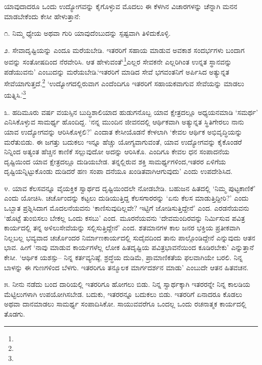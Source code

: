 ಯಾವುದಾದರೂ ಒಂದು ಉದ್ಯೋಗವನ್ನು ಕೈಗೊಳ್ಳುವ ಮೊದಲು ಈ ಕೆಳಗಿನ ವಿಚಾರಗಳನ್ನು ಚೆನ್ನಾಗಿ ಮನನ ಮಾಡಬೇಕೆಂದು ಕೇಸೀ ಹೇಳುತ್ತಾನೆ:

೧. ನಿಮ್ಮ ಧ್ಯೇಯ ಅಥವಾ ಗುರಿ ಯಾವುದೆಂಬುದನ್ನು ಸ್ಪಷ್ಟವಾಗಿ ತಿಳಿದುಕೊಳ್ಳಿ.

೨. ಸೇವಾದೃಷ್ಟಿಯನ್ನು ಎಂದೂ ಮರೆಯಬೇಡಿ. ಇತರರಿಗೆ ಸಹಾಯ ಮಾಡುವ ಅವಕಾಶ ಸಂದರ್ಭಗಳು ಬಂದಾಗ ಅವನ್ನು ಸಂತೋಷದಿಂದ ನೆರವೇರಿಸಿ. ಆತ ಹೇಳುವಂತೆ‘\footnote{}ಎಲ್ಲರ ಸೇವಕನೇ ಎಲ್ಲರಿಗಿಂತ ಉನ್ನತ ಸ್ಥಾನವನ್ನು ಪಡೆಯುವನು’ ಎಂಬುದನ್ನು ಮರೆಯಬೇಡಿ.\break ‘ಇತರರಿಗೆ ಮಾಡಿದ ಸೇವೆ ಭಗವಂತನಿಗೆ ಅರ್ಪಿಸಿದ ಅತ್ಯುನ್ನತ ಸೇವೆಯಾಗುತ್ತದೆ.\footnote{} ‘ಉದ್ಯೋಗ\-ದಲ್ಲಿರುವಾಗ ಎಂದೆಂದಿಗೂ ಇತರರಿಗೆ ಸಹಾಯಕವಾಗುವ ಸೇವೆಯನ್ನು ಮಾಡಲು ಯತ್ನಿಸಿ.'\footnote{}

೩. ಹದಿಮೂರು ವರ್ಷ ವಯಸ್ಸಿನ ಬುದ್ಧಿಶಾಲಿಯಾದ ಹುಡುಗನೊಬ್ಬ ಯಾವ ಕ್ಷೇತ್ರದಲ್ಲೂ ಅಧ್ಯಯನಮಾಡಿ ‘ಸಮರ್ಥ’ ಎನಿಸಿಕೊಳ್ಳುವ ಸಾಮರ್ಥ್ಯ ಹೊಂದಿದ್ದ. ‘ನನ್ನ ಮುಂದಿನ ಜೀವನದಲ್ಲಿ ಆರ್ಥಿಕವಾಗಿ ಅತ್ಯುನ್ನತ ಸ್ಥಿತಿಗೇರಲು ನಾನು ಯಾವ ಉದ್ಯೋಗವನ್ನು ಆರಿಸಿಕೊಳ್ಳಲಿ?’ ಎಂದಾತ ಕೇಸೀಯೊಡನೆ ಕೇಳಲಾಗಿ ‘ಕೇವಲ ಆರ್ಥಿಕ ಅಭಿವೃದ್ಧಿಯನ್ನು ಮರೆತುಬಿಡು. ಈ ಜಗತ್ತು ಬದುಕಲು ಇನ್ನೂ ಹೆಚ್ಚು ಯೋಗ್ಯವಾಗುವಂತೆ, ಯಾವ ಉದ್ಯೋಗವನ್ನು ಕೈಕೊಂಡರೆ ನಿನ್ನಿಂದ ಅತ್ಯಂತ ಹೆಚ್ಚಿನ ಕಾಣಿಕೆ ಸಲ್ಲುವುದೋ ಅದನ್ನು ಆರಿಸಿಕೊ. ಎಂದಿಗೂ ಕೇವಲ ಧನ ಸಂಪಾದನೆಯ ದೃಷ್ಟಿಯಿಂದ ಯಾವ ಕ್ಷೇತ್ರದಲ್ಲೂ ದುಡಿಯಬೇಡ. ತನ್ನಲ್ಲಿರುವ ಶಕ್ತಿ ಸಾಮರ್ಥ್ಯಗಳಿಂದ,\break ಇತರರ ಏಳಿಗೆಯ ದೃಷ್ಟಿಯನ್ನಿಟ್ಟುಕೊಂಡು ದುಡಿದರೆ ಹಣ ಸಂಪಾ ದನೆಯೂ ಖಂಡಿತವಾಗಿ\break ಆಗುವುದು’ ಎಂದು ಉಪದೇಶಿಸಿದ.

೪. ಯಾವ ಕೆಲಸವನ್ನೂ ವೈಯಕ್ತಿಕ ಸ್ವಾರ್ಥದ ದೃಷ್ಟಿಯಿಂದಲೇ ನೋಡಬೇಡಿ. ಬಹುಜನ ಹಿತದಲ್ಲಿ ‘ನಿಮ್ಮ ಪುಟ್ಟಕಾಣಿಕೆ’ ಎಂದು ಯೋಚಿಸಿ. ಚರ್ಚೊಂದನ್ನು ಕಟ್ಟಲು ದುಡಿಯುತ್ತಿದ್ದ ಕೆಲಸಗಾರರನ್ನು ‘ಏನು ಕೆಲಸ ಮಾಡುತ್ತಿದ್ದೀರಿ?’ ಎಂದು ಒಬ್ಬಾತ ಪ್ರಶ್ನಿಸಿದಾಗ ಮೊದಲನೆಯವನು ‘ಕಾಣಿಸುವುದಿಲ್ಲವೇ? ಇಟ್ಟಿಗೆ ಜೋಡಿಸುತ್ತಿದ್ದೇನೆ’ ಎಂದ. ಎರಡನೆಯವನು ‘ಹೊಟ್ಟೆ ತುಂಬಿಸಲು ಬೇಕಲ್ಲ ಒಂದು ಕಸಬು’ ಎಂದ. ಮೂರನೆಯವನು ‘ದೇವಮಂದಿರವನ್ನು ನಿರ್ಮಿಸುವ ಪವಿತ್ರ ಕಾರ್ಯದಲ್ಲಿ ತನ್ನ ಅಳಿಲುಸೇವೆಯನ್ನು ಸಲ್ಲಿಸುತ್ತಿದ್ದೇನೆ’ ಎಂದ. ಶತಮಾನಗಳ ಕಾಲ ಜನರ ಭಕ್ತಿಯ ಪ್ರತೀಕವಾಗಿ ನಿಲ್ಲಬಲ್ಲ ಭವ್ಯವಾದ ಚರ್ಚೊಂದರ ನಿರ್ಮಾಣಕಾರ್ಯದಲ್ಲಿ ಸುದೈವದಿಂದ ತಾನು ಪಾಲ್ಗೊಂಡಿದ್ದೇನೆ ಎನ್ನುವುದು ಆತನ ಭಾವ. ಹೀಗೆ ‘ನಾವು ಮಾಡುವ ಕಾರ್ಯಗಳೆಲ್ಲ ಲೋಕ ಹಿತದೃಷ್ಟಿಯ ಪವಿತ್ರಭಾವನೆಯಿಂದ ಕೂಡಿರಬೇಕು’ ಎನ್ನುತ್ತಾನೆ ಕೇಸೀ. ‘ಆರ್ಥಿಕ ಯಶಸ್ಸು– ನಿನ್ನ ಕರ್ತವ್ಯನಿಷ್ಠೆ, ಶ್ರದ್ಧೆಯ ದುಡಿಮೆ, ಪ್ರಾಮಾಣಿಕತೆಯ ಫಲವಾಗಿಯೇ ಬರಲಿ. ನಿನ್ನ ಬಾಳನ್ನು ಈ ಗುಣಗಳಿಂದ ಬೆಳಗು. ಇತರರಿಗೂ ತನ್ಮೂಲಕ ಮಾರ್ಗದರ್ಶನ ಮಾಡು’ ಎಂಬುದೇ ಆತನ ಹಿತವಚನ.

೫. ನೀನು ನಡೆದು ಬಂದ ದಾರಿಯಲ್ಲಿ ಇತರರಿಗೂ ಹೋಗಲು ಬಿಡು. ನಿನ್ನ ಸ್ವಾರ್ಥಕ್ಕಾಗಿ ಇತರರನ್ನೇ ನಿನ್ನ ಕಾಲಡಿಯ ಮೆಟ್ಟಿಲುಗಳಾಗಿ ಉಪಯೋಗಿಸಬೇಡ. ಬದುಕು, ಇತರರನ್ನೂ ಬದುಕಲು ಬಿಡು. ಇತರರಿಗೆ ಏನಾದರೂ ಕೊಡಲು ಅಥವಾ ದಾನಮಾಡಲು ಸಾಮರ್ಥ್ಯ ಸಂಪಾದಿಸಿಕೋ. ಸಾಯುವವರೆಗೂ ಒಂದಲ್ಲ ಒಂದು ರಚನಾತ್ಮಕ ಕಾರ್ಯದಲ್ಲಿ ತೊಡಗು.

